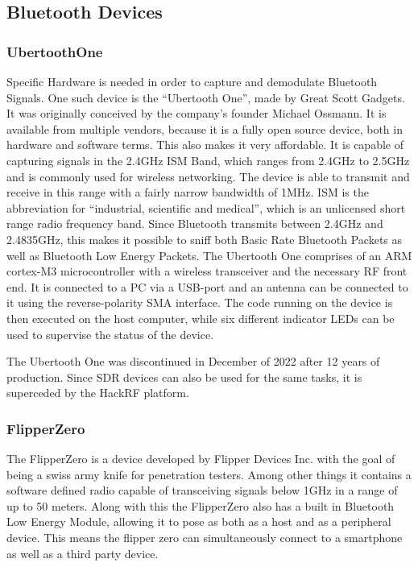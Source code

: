 \subsection{Bluetooth Devices}
\subsubsection{UbertoothOne} \label{ubertoothintroduction}
Specific Hardware is needed in order to capture and demodulate Bluetooth Signals. One such device is the ``Ubertooth One'', made by Great Scott Gadgets. It was originally conceived by the company's founder Michael Ossmann.\cite{ubertoothabout}
It is available from multiple vendors, because it is a fully open source device, both in hardware and software terms. This also makes it very affordable.
It is capable of capturing signals in the 2.4GHz ISM Band, which ranges from 2.4GHz to 2.5GHz and is commonly used for wireless networking. The device is able to transmit and receive in this range with a fairly narrow bandwidth of 1MHz.\cite{ubertoothfaq} ISM is the abbreviation for ``industrial, scientific and medical'', which is an unlicensed short range radio frequency band. Since Bluetooth transmits between 2.4GHz and 2.4835GHz, this makes it possible to sniff both Basic Rate Bluetooth Packets as well as Bluetooth Low Energy Packets.\cite{bluetoothrange}
The Ubertooth One comprises of an ARM cortex-M3 microcontroller with a wireless transceiver and the necessary RF front end. It is connected to a PC via a USB-port and an antenna can be connected to it using the reverse-polarity SMA interface. The code running on the device is then executed on the host computer, while six different indicator LEDs can be used to supervise the status of the device.%

The Ubertooth One was discontinued in December of 2022 after 12 years of production. Since SDR devices can also be used for the same tasks, it is superceded by the HackRF platform.

\subsubsection{FlipperZero}
The FlipperZero is a device developed by Flipper Devices Inc. with the goal of being a swiss army knife for penetration testers. Among other things it contains a software defined radio capable of transceiving signals below 1GHz in a range of up to 50 meters.
Along with this the FlipperZero also has a built in Bluetooth Low Energy Module, allowing it to pose as both as a host and as a peripheral device. This means the flipper zero can simultaneously connect to a smartphone as well as a third party device.\cite{flipperzero}


